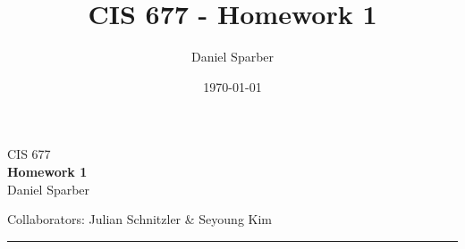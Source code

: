 \documentclass[11pt,letterpaper,titlepage]{scrartcl}
\begin{document}
\title{CIS 677 - Homework 1}
\author{Daniel Sparber}
\date{\today}



\thispagestyle{firstpage}

CIS 677 \vspace{5pt} 
\\ {\LARGE{\textbf{Homework 1}}} \vspace{5pt} 
\\ {\Large Daniel Sparber}

Collaborators: Julian Schnitzler \& Seyoung Kim 

\rule{\textwidth}{0.4pt}






\end{document}
